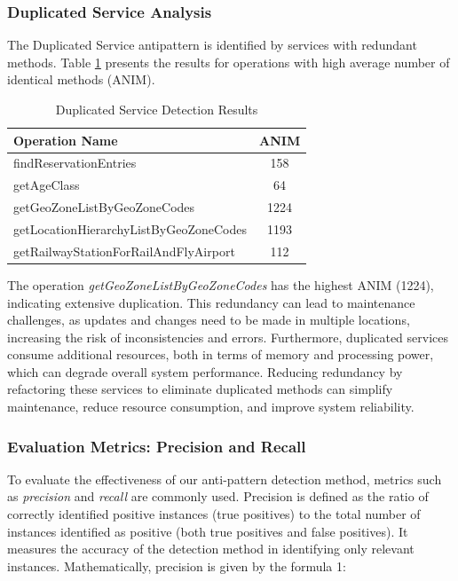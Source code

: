 \documentclass[12pt, times]{article}
\begin{document}
	\subsubsection{Duplicated Service Analysis}
	\hspace*{5mm} The Duplicated Service antipattern is identified by services with redundant methods. Table \ref{tab:duplicated_results} presents the results for operations with high average number of identical methods (ANIM).
	
	\begin{table}[h]
		\centering
		\begin{tabular}{|l|c|}
			\hline
			\textbf{Operation Name} & \textbf{ANIM} \\
			\hline
			findReservationEntries & 158 \\
			\hline
			getAgeClass & 64 \\
			\hline
			getGeoZoneListByGeoZoneCodes & 1224 \\
			\hline
			getLocationHierarchyListByGeoZoneCodes & 1193 \\
			\hline
			getRailwayStationForRailAndFlyAirport & 112 \\
			\hline
		\end{tabular}
		\caption{Duplicated Service Detection Results}
		\label{tab:duplicated_results}
	\end{table}
	
	\hspace*{5mm} The operation \textit{getGeoZoneListByGeoZoneCodes} has the highest ANIM (1224), indicating extensive duplication. This redundancy can lead to maintenance challenges, as updates and changes need to be made in multiple locations, increasing the risk of inconsistencies and errors. Furthermore, duplicated services consume additional resources, both in terms of memory and processing power, which can degrade overall system performance. Reducing redundancy by refactoring these services to eliminate duplicated methods can simplify maintenance, reduce resource consumption, and improve system reliability.
	
	
	\subsubsection{Evaluation Metrics: Precision and Recall}
	
	\hspace*{5mm} To evaluate the effectiveness of our anti-pattern detection method, metrics such as \textit{precision} and \textit{recall} are commonly used. Precision is defined as the ratio of correctly identified positive instances (true positives) to the total number of instances identified as positive (both true positives and false positives). It measures the accuracy of the detection method in identifying only relevant instances. Mathematically, precision is given by the formula 1:
	
\end{document}
